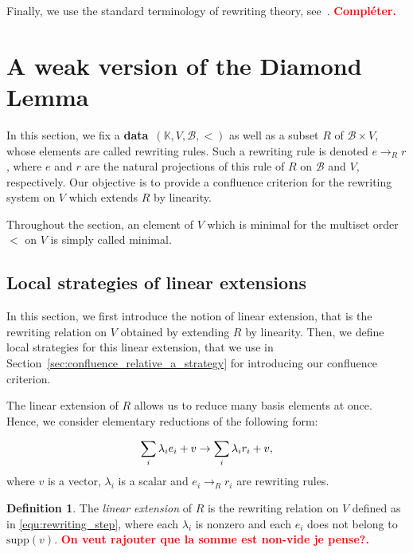 \documentclass[10pt]{easychair}
\theoremstyle{definition}
\newtheorem{definition}[theorem]{Definition}
\newcommand\todo[1]{{\bf\textcolor{red}{#1.}}}
\newcommand\data{{\color{red}\bf data}}
\newcommand\supp{\text{supp}}
\newcommand\basis{\mathscr{B}}
\newcommand\K{\mathbb{K}}
\newcommand\rewR{\to_R}
\begin{document}
Finally, we use the standard terminology of rewriting theory,
see~\cite{MR1629216}. \todo{Compléter}

\section{A weak version of the Diamond Lemma}
\label{sec:a_weak_version_of_the_Diamond_Lemma}

In this section, we fix a \data\ $(\K,V,\basis,<)$ as well as a subset
$R$ of $\basis\times V$, whose elements are called rewriting rules. Such
a rewriting rule is denoted $e\rewR r$, where $e$ and $r$ are the natural
projections of this rule of $R$ on $\basis$ and $V$, respectively. Our
objective is to provide a confluence criterion for the rewriting system
on $V$ which extends $R$ by linearity.
\medskip

Throughout the section, an element of $V$ which is minimal for the
multiset order~$<$ on $V$ is simply called minimal.

\subsection{Local strategies of linear extensions}
\label{sec:local_strategies_of_linear_extensions}

In this section, we first introduce the notion of linear extension, that
is the rewriting relation on $V$ obtained by extending $R$ by linearity.
Then, we define local strategies for this linear extension, that we use
in Section~\ref{sec:confluence_relative_a_strategy} for introducing our
confluence criterion.
\medskip

The linear extension of $R$ allows us to reduce many basis elements at
once. Hence, we consider elementary reductions of the following form:

\begin{equation}\label{equ:rewriting_step}
  \sum_i\lambda_ie_i+v\to\sum_i\lambda_ir_i+v,
  \smallskip
\end{equation}
where $v$ is a vector, $\lambda_i$ is a scalar and $e_i\rewR r_i$ are
rewriting rules.
\smallskip

\begin{definition}\label{def:extensions}
  The {\em linear extension} of $R$ is the rewriting relation on $V$
  defined as in \eqref{equ:rewriting_step}, where each $\lambda_i$
  is nonzero and each $e_i$ does not belong to $\supp(v)$.
  \todo{On veut rajouter que la somme est non-vide je pense?}
\end{definition}
\smallskip
\end{document}
